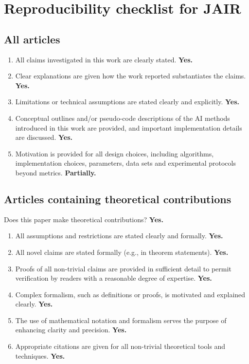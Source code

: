\section{Reproducibility checklist for JAIR}\label{app:checklist}

\subsection*{All articles}

\begin{enumerate}[leftmargin=1.8em,itemsep=1pt]
\item All claims investigated in this work are clearly stated. \textbf{Yes.}
\item Clear explanations are given how the work reported substantiates the claims. \textbf{Yes.}
\item Limitations or technical assumptions are stated clearly and explicitly. \textbf{Yes.}
\item Conceptual outlines and/or pseudo-code descriptions of the AI methods introduced in this work are provided, and important implementation details are discussed. \textbf{Yes.}
\item Motivation is provided for all design choices, including algorithms, implementation choices, parameters, data sets and experimental protocols beyond metrics. \textbf{Partially.}
\end{enumerate}

\subsection*{Articles containing theoretical contributions}

Does this paper make theoretical contributions? \textbf{Yes.}

\begin{enumerate}[leftmargin=1.8em,itemsep=1pt]
\item All assumptions and restrictions are stated clearly and formally. \textbf{Yes.}
\item All novel claims are stated formally (e.g., in theorem statements). \textbf{Yes.}
\item Proofs of all non-trivial claims are provided in sufficient detail to permit verification by readers with a reasonable degree of expertise. \textbf{Yes.}
\item Complex formalism, such as definitions or proofs, is motivated and explained clearly. \textbf{Yes.}
\item The use of mathematical notation and formalism serves the purpose of enhancing clarity and precision. \textbf{Yes.}
\item Appropriate citations are given for all non-trivial theoretical tools and techniques. \textbf{Yes.}
\end{enumerate}

